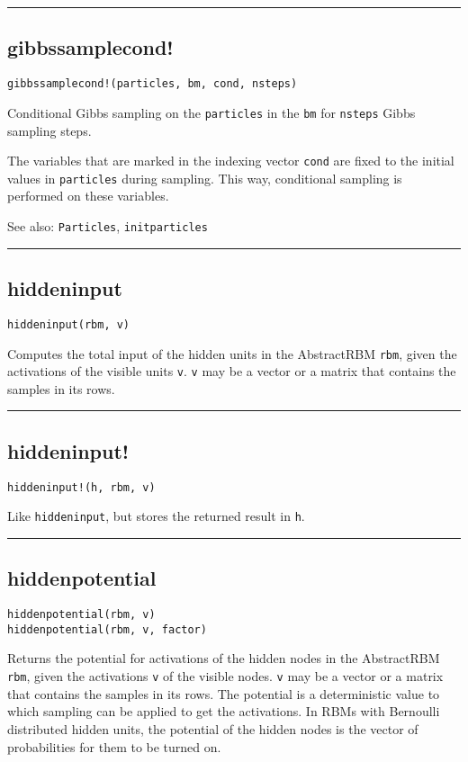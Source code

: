\noindent\rule{\textwidth}{1pt}
\subsection*{gibbssamplecond!}
\begin{verbatim}
gibbssamplecond!(particles, bm, cond, nsteps)
\end{verbatim}
Conditional Gibbs sampling on the \texttt{particles} in the \texttt{bm} for \texttt{nsteps} Gibbs sampling steps.

The variables that are marked in the indexing vector \texttt{cond} are fixed to the initial values in \texttt{particles} during sampling. This way, conditional sampling is performed on these variables.

See also: \texttt{Particles}, \texttt{initparticles}

\noindent\rule{\textwidth}{1pt}
\subsection*{hiddeninput}
\begin{verbatim}
hiddeninput(rbm, v)
\end{verbatim}
Computes the total input of the hidden units in the AbstractRBM \texttt{rbm}, given the activations of the visible units \texttt{v}. \texttt{v} may be a vector or a matrix that contains the samples in its rows.

\noindent\rule{\textwidth}{1pt}
\subsection*{hiddeninput!}
\begin{verbatim}
hiddeninput!(h, rbm, v)
\end{verbatim}
Like \texttt{hiddeninput}, but stores the returned result in \texttt{h}.

\noindent\rule{\textwidth}{1pt}
\subsection*{hiddenpotential}
\begin{verbatim}
hiddenpotential(rbm, v)
hiddenpotential(rbm, v, factor)
\end{verbatim}
Returns the potential for activations of the hidden nodes in the AbstractRBM \texttt{rbm}, given the activations \texttt{v} of the visible nodes. \texttt{v} may be a vector or a matrix that contains the samples in its rows. The potential is a deterministic value to which sampling can be applied to get the activations. In RBMs with Bernoulli distributed hidden units, the potential of the hidden nodes is the vector of probabilities for them to be turned on.

